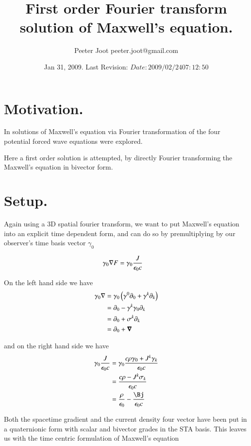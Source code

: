 \documentclass{article}
\title{ First order Fourier transform solution of Maxwell's equation. }
\author{Peeter Joot \quad peeter.joot@gmail.com}
\date{ Jan 31, 2009.  Last Revision: $Date: 2009/02/24 07:12:50 $ }
\begin{document}
\maketitle{}

\tableofcontents

\section{ Motivation. }

In \cite{PJfourierMaxwellSecondOrder} solutions of Maxwell's equation
via Fourier transformation of the four potential forced wave equations were
explored.

Here a first order solution is attempted, by directly Fourier transforming
the Maxwell's equation in bivector form.

\section{ Setup. }

Again using a 3D spatial fourier transform, we want to put Maxwell's equation into an explicit time dependent form, and can do so by
premultiplying by our observer's time basis vector $\gamma_0$

\begin{align*}
\gamma_0 \nabla F &= \gamma_0 \frac{J }{\epsilon_0 c}
\end{align*}

On the left hand side we have
\begin{align*}
\gamma_0 \nabla 
&= \gamma_0 \left( \gamma^0 \partial_0 + \gamma^k \partial_k \right) \\
&= \partial_0 - \gamma^k \gamma_0 \partial_k \\
&= \partial_0 + \sigma^k \partial_k \\
&= \partial_0 + \boldsymbol{\nabla} \\
\end{align*}

and on the right hand side we have
\begin{align*}
\gamma_0 \frac{J }{\epsilon_0 c}
&= \gamma_0 \frac{c \rho \gamma_0 + J^k \gamma_k }{\epsilon_0 c} \\
&= \frac{c \rho - J^k \sigma_k }{\epsilon_0 c} \\
&= \frac{\rho}{\epsilon_0} - \frac{\Bj}{\epsilon_0 c} \\
\end{align*}

Both the spacetime gradient and the current density four vector have been put in a quaternionic form with scalar and bivector grades in the 
STA basis.  This leaves us with the time centric formulation of Maxwell's equation
\end{document}
